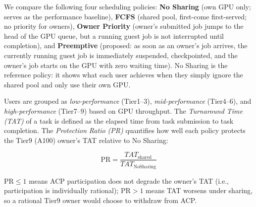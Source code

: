 We compare the following four scheduling policies:
\textbf{No Sharing} (own GPU only; serves as the performance baseline),
\textbf{FCFS} (shared pool, first-come first-served; no priority for owners),
\textbf{Owner Priority} (owner's submitted job jumps to the head of the GPU queue,
  but a running guest job is not interrupted until completion), and
\textbf{Preemptive} (proposed: as soon as an owner's job arrives,
  the currently running guest job is immediately suspended,
  checkpointed, and the owner's job starts on the GPU with zero waiting time).
No Sharing is the reference policy: it shows what each user achieves
when they simply ignore the shared pool and only use their own GPU.


Users are grouped as
\emph{low-performance} (Tier1--3),
\emph{mid-performance} (Tier4--6), and
\emph{high-performance} (Tier7--9)
based on GPU throughput.
The \emph{Turnaround Time (TAT)} of a task is defined as the elapsed time
from task submission to task completion.
The \emph{Protection Ratio (PR)} quantifies how well each policy
protects the Tier9 (A100) owner's TAT relative to No Sharing:

\begin{equation}
  \mathrm{PR} = \frac{TAT_{\mathrm{shared}}}{TAT_{\mathrm{NoSharing}}}
  \label{eq:pr_def}
\end{equation}

$\mathrm{PR} \leq 1$ means ACP participation does not degrade the owner's TAT
(i.e., participation is individually rational);
$\mathrm{PR} > 1$ means TAT worsens under sharing,
so a rational Tier9 owner would choose to withdraw from ACP.


